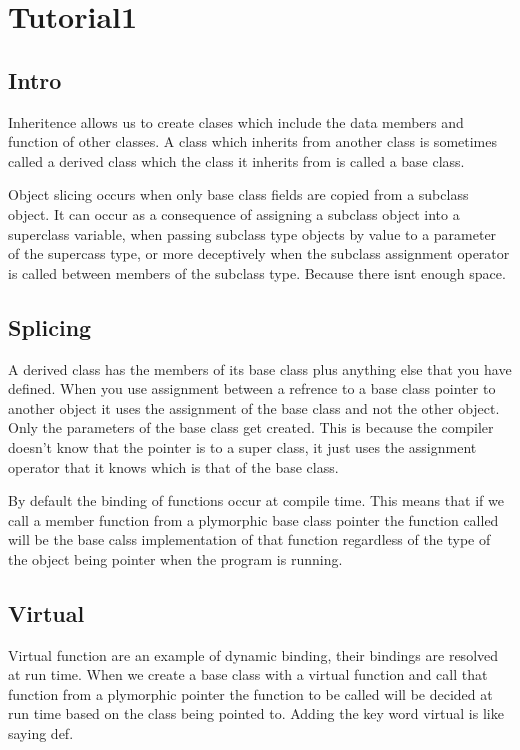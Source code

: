 \documentclass[12pt]{article}
\begin{document}
\section*{Tutorial1}
\subsection*{Intro}
Inheritence allows us to create clases which include the data members and function of other classes. A class which inherits from another class is sometimes called a derived class which the class it inherits from is called a base class.

Object slicing occurs when only base class fields are copied from a subclass object. It can occur as a consequence of assigning a subclass object into a superclass variable, when passing subclass type objects by value to a parameter of the supercass type, or more deceptively when the subclass assignment operator is called between members of the subclass type. Because there isnt enough space. 

\subsection{Splicing}

A derived class has the members of its base class plus anything else that you have defined. When you use assignment between a refrence to a base class pointer to another object it uses the assignment of the base class and not the other object. Only the parameters of the base class get created. This is because the compiler doesn't know that the pointer is to a super class, it just uses the assignment operator that it knows which is that of the base class. 

By default the binding of functions occur at compile time. This means that if we call a member function from a plymorphic base class pointer the function called will be the base calss implementation of that function regardless of the type of the object being pointer when the program is running.

\subsection{Virtual}

Virtual function are an example of dynamic binding, their bindings are resolved at run time. When we create a base class with a virtual function and call that function from a plymorphic pointer the function to be called will be decided at run time based on the class being pointed to. Adding the key word virtual is like saying def.
\end{document}
